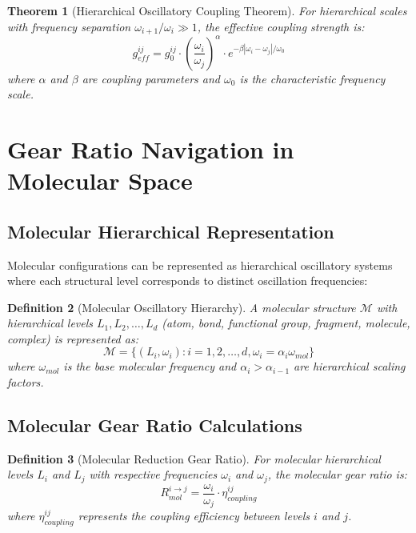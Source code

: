 \documentclass[12pt,a4paper]{article}
\newtheorem{theorem}{Theorem}[section]
\newtheorem{definition}[theorem]{Definition}
\begin{document}
\begin{theorem}[Hierarchical Oscillatory Coupling Theorem]
For hierarchical scales with frequency separation $\omega_{i+1}/\omega_i \gg 1$, the effective coupling strength is:
\begin{equation}
g_{eff}^{ij} = g_0^{ij} \cdot \left(\frac{\omega_i}{\omega_j}\right)^{\alpha} \cdot e^{-\beta|\omega_i - \omega_j|/\omega_0}
\end{equation}
where $\alpha$ and $\beta$ are coupling parameters and $\omega_0$ is the characteristic frequency scale.
\end{theorem}

\section{Gear Ratio Navigation in Molecular Space}

\subsection{Molecular Hierarchical Representation}

Molecular configurations can be represented as hierarchical oscillatory systems where each structural level corresponds to distinct oscillation frequencies:

\begin{definition}[Molecular Oscillatory Hierarchy]
A molecular structure $\mathcal{M}$ with hierarchical levels $L_1, L_2, \ldots, L_d$ (atom, bond, functional group, fragment, molecule, complex) is represented as:
\begin{equation}
\mathcal{M} = \{(L_i, \omega_i) : i = 1, 2, \ldots, d, \omega_i = \alpha_i \omega_{mol}\}
\end{equation}
where $\omega_{mol}$ is the base molecular frequency and $\alpha_i > \alpha_{i-1}$ are hierarchical scaling factors.
\end{definition}

\subsection{Molecular Gear Ratio Calculations}

\begin{definition}[Molecular Reduction Gear Ratio]
For molecular hierarchical levels $L_i$ and $L_j$ with respective frequencies $\omega_i$ and $\omega_j$, the molecular gear ratio is:
\begin{equation}
R_{mol}^{i \to j} = \frac{\omega_i}{\omega_j} \cdot \eta_{coupling}^{ij}
\end{equation}
where $\eta_{coupling}^{ij}$ represents the coupling efficiency between levels $i$ and $j$.
\end{definition}
\end{document}
